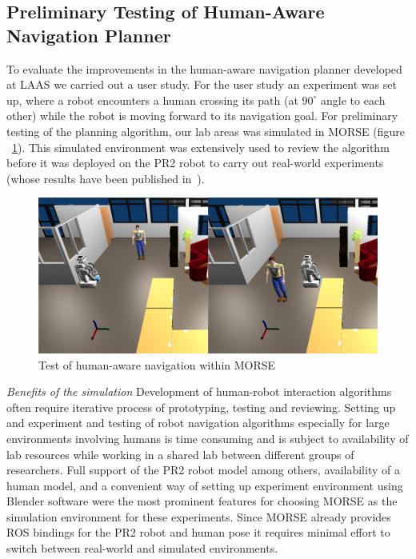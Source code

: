 \documentclass[conference]{IEEEtran}
\begin{document}
\subsection{Preliminary Testing of Human-Aware Navigation Planner}
\label{sc:navigation}

To evaluate the improvements in the human-aware navigation planner developed at
LAAS we carried out a user study. For the user study an experiment was set up,
where a robot encounters a human crossing its path (at $90^{\circ }$ angle to
each other) while the robot is moving forward to its navigation goal. For
preliminary testing of the planning algorithm, our lab areas was simulated in
MORSE (figure ~\ref{fig|hanp}). This simulated environment was extensively used
to review the algorithm before it was deployed on the PR2 robot to carry out
real-world experiments (whose results have been published
in~\cite{ThibaultKruse2014}).

\begin{figure}[H]
      \centering
      \includegraphics[width=0.9\linewidth]{morsehanp.png}
      \caption{Test of human-aware navigation within MORSE}
      \label{fig|hanp}
\end{figure}

\emph{Benefits of the simulation} Development of human-robot interaction
algorithms often require iterative process of prototyping, testing and
reviewing. Setting up and experiment and testing of robot navigation algorithms
especially for large environments involving humans is time consuming and is
subject to availability of lab resources while working in a shared lab between
different groups of researchers. Full support of the PR2 robot model among
others, availability of a human model, and a convenient way of setting up
experiment environment using Blender software were the most prominent features
for choosing MORSE as the simulation environment for these experiments. Since
MORSE already provides ROS bindings for the PR2 robot and human pose it requires
minimal effort to switch between real-world and simulated environments.
\end{document}
